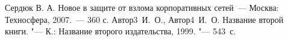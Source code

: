 \documentclass[russian, utf8, pointsubsection, floatsubsection,
equationsection, emptystyle, simple]{eskdtext}
\begin{document}


\tableofcontents
\newpage





\begin{thebibliography}{99}
 Сердюк В. А. Новое в защите от взлома корпоративных
  сетей~--- Москва: Техносфера, 2007.~--- 360 с.
 Автор3~И.~О., Автор4~И.~О. Название второй книги. "--- К.:
Название второго издательства, 1999. "--- 543~с.
\end{thebibliography}



\end{document}
